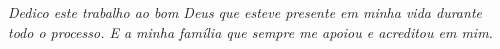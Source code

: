 \begin{dedicatoria}
   \vspace*{\fill}
   \centering
   \noindent
   \textit{Dedico este trabalho ao bom Deus que esteve presente em minha vida durante todo o processo.
   E a minha família que sempre me apoiou e acreditou em mim.} \vspace*{\fill}
\end{dedicatoria}